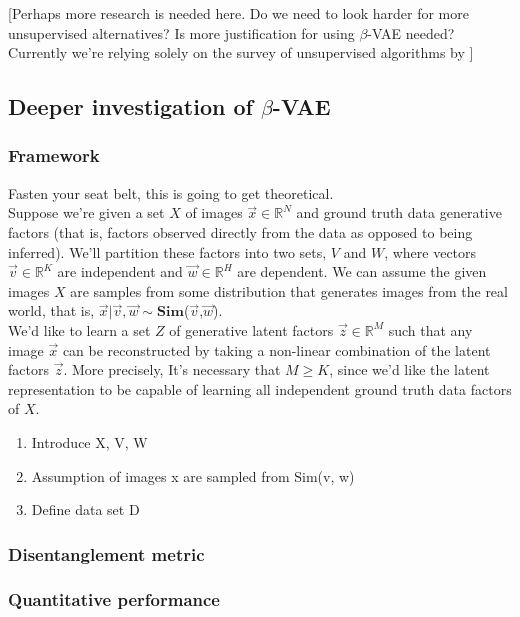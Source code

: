 \documentclass[12pt,twoside]{article}
\begin{document}
[Perhaps more research is needed here. Do we need to look harder for more unsupervised alternatives? Is more justification for using $\beta$-VAE needed? Currently we're relying solely on the survey of unsupervised algorithms by \cite{Higgins2016}]\\

\subsection{Deeper investigation of $\beta$-VAE}
\subsubsection{Framework}

Fasten your seat belt, this is going to get theoretical.\\

Suppose we're given a set $X$ of images $\vec{x}\in\mathbb{R}^N$ and ground truth data generative factors (that is, factors observed directly from the data as opposed to being inferred). We'll partition these factors into two sets, $V$ and $W$, where vectors $\vec{v}\in\mathbb{R}^K$ are independent and $\vec{w}\in\mathbb{R}^H$ are dependent. We can assume the given images $X$ are samples from some distribution that generates images from the real world, that is, $\vec{x}|\vec{v},\vec{w}\sim\mathbf{Sim}$($\vec{v}$,$\vec{w}$).\\

We'd like to learn a set $Z$ of generative latent factors $\vec{z}\in\mathbb{R}^M$ such that any image $\vec{x}$ can be reconstructed by taking a non-linear combination of the latent factors $\vec{z}$. More precisely,  It's necessary that $M\geq K$, since we'd like the latent representation to be capable of learning all independent ground truth data factors of $X$.

\begin{enumerate}
\item Introduce X, V, W
\item Assumption of images x are sampled from Sim(v, w)
\item Define data set D
\end{enumerate}
\subsubsection{Disentanglement metric}
\subsubsection{Quantitative performance}
\end{document}
